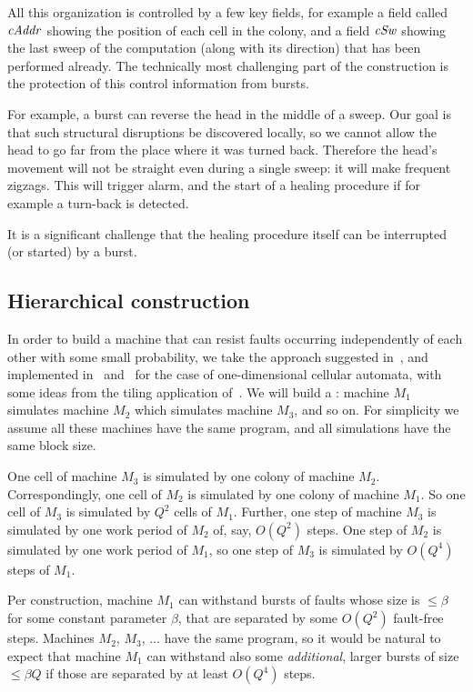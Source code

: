 \documentclass[12pt]{memoir}
\renewcommand{\le}{\leq}
\newcommand{\fld}[1]{\ensuremath{\textit{#1\/}}}
\newcommand{\cAddr}{\fld{cAddr}}
\newcommand{\cSweep}{\fld{cSw}}
\begin{document}
All this organization is controlled by a few key fields, for example a field
called \( \cAddr \) showing the position of each cell in the colony, and a field
\( \cSweep \) showing the last sweep of the computation (along with its direction)
that has been performed already.
The technically most challenging part of the construction is the protection of this
control information from bursts.

For example, a burst can reverse the head in the middle of a sweep.
Our goal is that such structural disruptions be discovered locally, so
we cannot allow the head to go far from the place where it was turned back.
Therefore the head's movement will not be straight even during a single
sweep: it will make frequent zigzags.
This will trigger alarm, and the start of a healing procedure if for example
a turn-back is detected.

It is a significant challenge that the healing procedure
itself can be interrupted (or started) by a burst.


\subsection{Hierarchical construction}\label{sec:hier}

In order to build a machine that can resist faults 
occurring independently of each other with some small probability,
we take the approach suggested in~\cite{Kurd78},
and implemented in~\cite{Gacs1dim86} and~\cite{GacsSorg01}
for the case of one-dimensional cellular automata, with some ideas
from the tiling application of~\cite{DurandRomashShenTiling12}.
We will build a :
machine \( M_1 \) simulates machine \( M_2 \) which 
simulates machine \( M_3 \), and so on.
For simplicity we assume all these machines have the same program,
and all simulations have the same block size.

One cell of machine \( M_3 \) is simulated by one colony of machine \( M_2 \).
Correspondingly, one cell of \( M_2 \) is simulated by
one colony of machine \( M_1 \).
So one cell of \( M_3 \) is simulated by \( Q^2 \) cells of \( M_1 \).
Further, one step of machine \( M_3 \) is simulated by one
work period of \( M_2 \) of, say, \( O(Q^{2}) \) steps.
One step of \( M_2 \) is simulated by one work period of \( M_1 \),
so one step of \( M_3 \) is simulated by \( O(Q^{4}) \) steps of \( M_1 \).

Per construction, machine \( M_{1} \) can withstand
bursts of faults whose size is \( \le \beta \) for some constant parameter \( \beta \), that
are separated by some \( O(Q^{2}) \) fault-free steps.
Machines \( M_2 \), \( M_3 \), \( \dots \) have the same program, so it
would be natural to expect that machine
\( M_1 \) can withstand also some \emph{additional}, larger bursts
of size \( \le \beta Q \) if those are separated by at least \( O(Q^{4}) \) steps.
\end{document}
